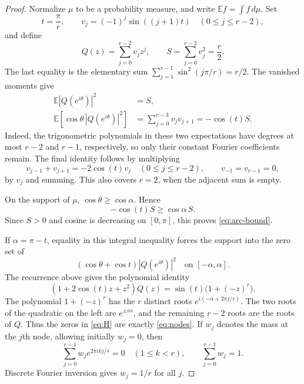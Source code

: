 \documentclass[10pt,a4paper]{amsart}
\newcommand{\E}{\mathbb E}
\begin{document}
\begin{proof}
Normalize $\mu$ to be a probability measure, and write
$\E f=\int f\,d\mu$. Set
\begin{equation}\label{eq:sine-vector}
 t=\frac\pi r,\qquad
 v_j=(-1)^j\sin((j+1)t)\quad(0\le j\le r-2),
\end{equation}
and define
\begin{equation}\label{eq:Q}
 Q(z)=\sum_{j=0}^{r-2}v_jz^j,\qquad
 S=\sum_{j=0}^{r-2}v_j^2=\frac r2.
\end{equation}
The last equality is the elementary sum
$\sum_{j=1}^{r-1}\sin^2(j\pi/r)=r/2$.
The vanished moments give
\begin{align}
 \E|Q(e^{i\theta})|^2&=S,\label{eq:norm}\\
 \E\!\left[\cos\theta\,|Q(e^{i\theta})|^2\right]
 &=\sum_{j=0}^{r-3}v_jv_{j+1}
 =-\cos(t)S.\label{eq:cosine}
\end{align}
Indeed, the trigonometric polynomials in these two expectations have
degrees at most $r-2$ and $r-1$, respectively, so only their constant
Fourier coefficients remain. The final identity follows by multiplying
\[
 v_{j-1}+v_{j+1}=-2\cos(t)v_j\quad(0\le j\le r-2),
 \qquad v_{-1}=v_{r-1}=0,
\]
by $v_j$ and summing. This also covers $r=2$, when the adjacent sum
is empty.

On the support of $\mu$, $\cos\theta\ge\cos\alpha$. Hence
\[
 -\cos(t)S\ge\cos\alpha\,S.
\]
Since $S>0$ and cosine is decreasing on $[0,\pi]$, this proves
\eqref{eq:arc-bound}.

If $\alpha=\pi-t$, equality in this integral inequality forces the
support into the zero set of
\begin{equation}\label{eq:H}
 (\cos\theta+\cos t)|Q(e^{i\theta})|^2
 \quad\text{on }[-\alpha,\alpha].
\end{equation}
The recurrence above gives the polynomial identity
\begin{equation}\label{eq:Qidentity}
 (1+2\cos(t)z+z^2)Q(z)=\sin(t)\bigl(1+(-z)^r\bigr).
\end{equation}
The polynomial $1+(-z)^r$ has the $r$ distinct roots
$e^{i(-\alpha+2\pi j/r)}$. The two roots of the quadratic on the left
are $e^{\pm i\alpha}$, and the remaining $r-2$ roots are the roots of
$Q$. Thus the zeros in \eqref{eq:H} are exactly \eqref{eq:nodes}.
If $w_j$ denotes the mass at the $j$th node, allowing initially $w_j=0$,
then
\[
 \sum_{j=0}^{r-1}w_je^{2\pi ikj/r}=0\quad(1\le k<r),
 \qquad \sum_{j=0}^{r-1}w_j=1.
\]
Discrete Fourier inversion gives $w_j=1/r$ for all $j$.
\end{proof}
\end{document}

